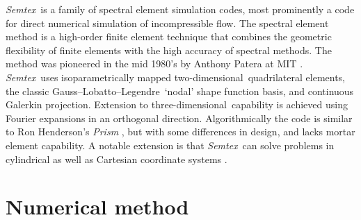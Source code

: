 \documentclass[11pt]{report}
\newcommand{\Semtex}{\emph{Semtex}} \newcommand{\Dog}{\emph{Dog}}
\newcommand\twod{two-di\-men\-sion\-al}
\newcommand\threed{three-di\-men\-sion\-al}
\newcommand\GLL{Gauss--Lobatto--Legendre}
\begin{document}
\Semtex\ is a family of spectral element simulation codes, most
prominently a code for direct numerical simulation of incompressible
flow.  The spectral element method is a high-order finite element
technique that combines the geometric flexibility of finite elements
with the high accuracy of spectral methods.  The method was pioneered
in the mid 1980's by Anthony Patera at MIT
\citep{pat84,kp86}. \Semtex\ uses isoparametrically mapped
\twod\ quadrilateral elements, the classic \GLL\ `nodal' shape
function basis, and continuous Galerkin projection. Extension to
\threed\ capability is achieved using Fourier expansions in an
orthogonal direction.  Algorithmically the code is similar to Ron
Henderson's \emph{Prism} \citep{hk95,kh98,hen99b}, but with some
differences in design, and lacks mortar element capability. A notable
extension is that \Semtex\ can solve problems in cylindrical as well
as Cartesian coordinate systems \citep{blsh04,blas19}.

\section{Numerical method}
\end{document}

